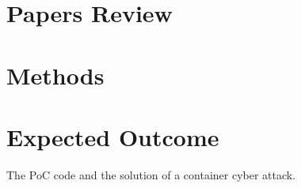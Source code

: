 \documentclass[12pt,a4paper,oneside,draft]{article}
\begin{document}
\section{Papers Review}

\section{Methods}

\section{Expected Outcome}
The PoC code and the solution of a container cyber attack.

\printbibheading[heading=bibnumbered]
\printbibliography
\end{document}
